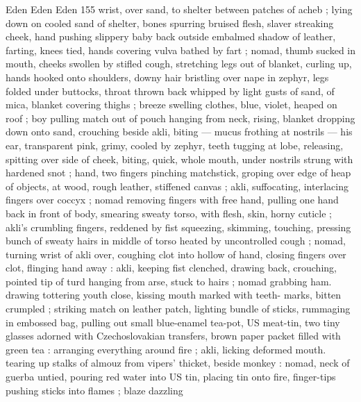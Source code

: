 Eden Eden Eden 155
wrist, over sand, to shelter between patches of acheb ; lying down on
cooled sand of shelter, bones spurring bruised flesh, slaver
streaking cheek, hand pushing slippery baby back outside embalmed
shadow of leather, farting, knees tied, hands covering vulva bathed
by fart ; nomad, thumb sucked in mouth, cheeks swollen by stifled
cough, stretching legs out of blanket, curling up, hands hooked onto
shoulders, downy hair bristling over nape in zephyr, legs folded
under buttocks, throat thrown back whipped by light gusts of sand,
of mica, blanket covering thighs ; breeze swelling clothes, blue,
violet, heaped on roof ; boy pulling match out of pouch hanging from
neck, rising, blanket dropping down onto sand, crouching beside akli,
biting — mucus frothing at nostrils — his ear, transparent pink,
grimy, cooled by zephyr, teeth tugging at lobe, releasing, spitting
over side of cheek, biting, quick, whole mouth, under nostrils strung
with hardened snot ; hand, two fingers pinching matchstick, groping
over edge of heap of objects, at wood, rough leather, stiffened
canvas ; akli, suffocating, interlacing fingers over coccyx ; nomad
removing fingers with free hand, pulling one hand back in front of
body, smearing sweaty torso, with flesh, skin, horny cuticle ; akli's
crumbling fingers, reddened by fist squeezing, skimming, touching,
pressing bunch of sweaty hairs in middle of torso heated by
uncontrolled cough ; nomad, turning wrist of akli over, coughing clot
into hollow of hand, closing fingers over clot, flinging hand away :
akli, keeping fist clenched, drawing back, crouching, pointed tip of
turd hanging from arse, stuck to hairs ; nomad grabbing ham.
drawing tottering youth close, kissing mouth marked with teeth-
marks, bitten crumpled ; striking match on leather patch, lighting
bundle of sticks, rummaging in embossed bag, pulling out small
blue-enamel tea-pot, US meat-tin, two tiny glasses adorned with
Czechoslovakian transfers, brown paper packet filled with green tea
: arranging everything around fire ; akli, licking deformed mouth.
tearing up stalks of almouz from vipers’ thicket, beside monkey :
nomad, neck of guerba untied, pouring red water into US tin, placing
tin onto fire, finger-tips pushing sticks into flames ; blaze dazzling


